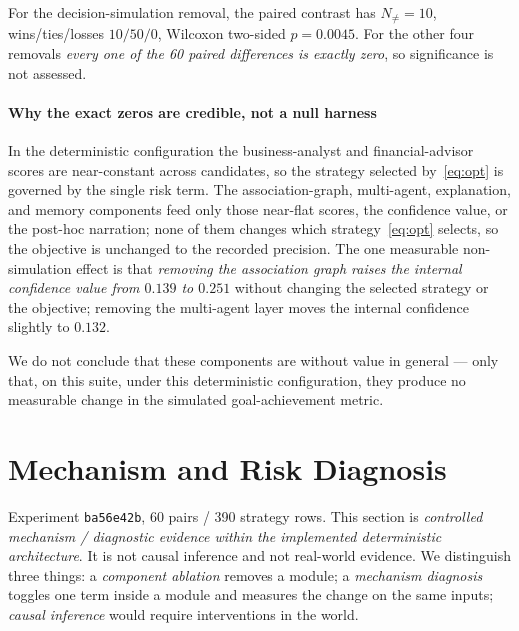 \documentclass[conference]{IEEEtran}
\newcommand{\Nnz}{N_{\neq}}                 %
\newcommand{\expid}[1]{\texttt{#1}}
\begin{document}
For the decision-simulation removal, the paired contrast has $\Nnz = 10$,
wins/ties/losses $10/50/0$, Wilcoxon two-sided $p = 0.0045$. For the other four
removals \emph{every one of the 60 paired differences is exactly zero}, so
significance is not assessed.

\paragraph{Why the exact zeros are credible, not a null harness}
In the deterministic configuration the business-analyst and financial-advisor
scores are near-constant across candidates, so the strategy selected
by~\eqref{eq:opt} is governed by the single risk term. The association-graph,
multi-agent, explanation, and memory components feed only those near-flat
scores, the confidence value, or the post-hoc narration; none of them changes
which strategy~\eqref{eq:opt} selects, so the objective is unchanged to the
recorded precision. The one measurable non-simulation effect is that
\emph{removing the association graph raises the internal confidence value from
$0.139$ to $0.251$} without changing the selected strategy or the objective;
removing the multi-agent layer moves the internal confidence slightly to
$0.132$.

We do not conclude that these components are without value in general --- only
that, on this suite, under this deterministic configuration, they produce no
measurable change in the simulated goal-achievement metric.

\section{Mechanism and Risk Diagnosis}
\label{sec:mechanism}

Experiment \expid{ba56e42b}, 60 pairs / 390 strategy rows. This section is
\emph{controlled mechanism / diagnostic evidence within the implemented
deterministic architecture}. It is not causal inference and not real-world
evidence. We distinguish three things: a \emph{component ablation} removes a
module; a \emph{mechanism diagnosis} toggles one term inside a module and
measures the change on the same inputs; \emph{causal inference} would require
interventions in the world.
\end{document}
